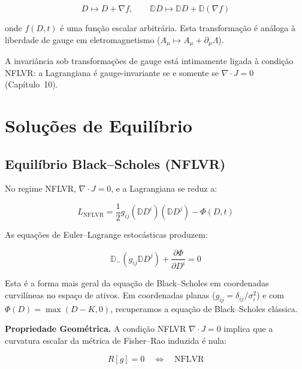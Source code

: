 \begin{equation}\label{eq:gauge-financeira}
D \mapsto D + \nabla f, \qquad \mathbb{D}D \mapsto \mathbb{D}D + \mathbb{D}(\nabla f)
\end{equation}

onde $f(D,t)$ \'e uma fun\c{c}\~ao escalar arbitr\'aria. Esta transforma\c{c}\~ao \'e an\'aloga \`a liberdade de gauge em eletromagnetismo ($A_\mu \mapsto A_\mu + \partial_\mu \Lambda$).

A invari\^ancia sob transforma\c{c}\~oes de gauge est\'a intimamente ligada \`a condi\c{c}\~ao NFLVR: a Lagrangiana \'e gauge-invariante se e somente se $\nabla \cdot J = 0$ (Cap\'itulo~10).

\section{Solu\c{c}\~oes de Equil\'ibrio}

\subsection{Equil\'ibrio Black--Scholes (NFLVR)}

No regime NFLVR, $\nabla \cdot J = 0$, e a Lagrangiana se reduz a:

\begin{equation}\label{eq:L-NFLVR}
L_{\text{NFLVR}} = \frac{1}{2} g_{ij} (\mathbb{D}D^i)(\mathbb{D}D^j) - \Phi(D,t)
\end{equation}

As equa\c{c}\~oes de Euler--Lagrange estoc\'asticas produzem:

\begin{equation}\label{eq:EL-NFLVR}
\mathbb{D}_-(g_{ij} \mathbb{D}D^j) + \frac{\partial \Phi}{\partial D^i} = 0
\end{equation}

Esta \'e a forma mais geral da equa\c{c}\~ao de Black--Scholes em coordenadas curvil\'ineas no espa\c{c}o de ativos. Em coordenadas planas ($g_{ij} = \delta_{ij}/\sigma_i^2$) e com $\Phi(D) = \max(D-K,0)$, recuperamos a equa\c{c}\~ao de Black--Scholes cl\'assica.

\medskip
\noindent\textbf{Propriedade Geom\'etrica.} A condi\c{c}\~ao NFLVR $\nabla \cdot J = 0$ implica que a curvatura escalar da m\'etrica de Fisher--Rao induzida \'e nula:

\begin{equation}\label{eq:curvatura-nula}
R[g] = 0 \quad \Longleftrightarrow \quad \text{NFLVR}
\end{equation}

